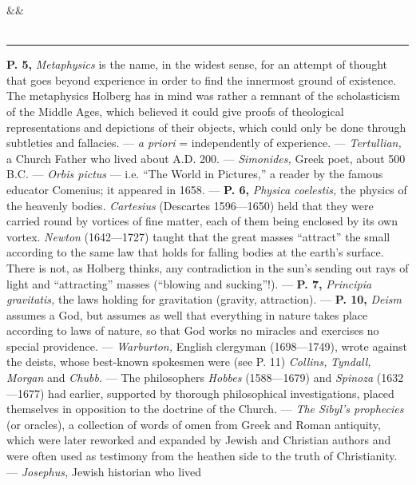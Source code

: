 \documentclass[12pt,a4paper,openany]{book}
\newcommand{\opage}[1]{\marginnote{\footnotesize\textit{[#1]}}}
\newcommand{\anthsection}[2]{\clearpage\begin{center}\ifx&#1&\else{\large #1}\\[0.6em]\fi{\Large #2}\\[0.5em]\rule{3em}{0.4pt}\end{center}\medskip}
\begin{document}
\setcounter{footnote}{0}%
\anthsection{} {NOTES}\opage{301}

\textbf{P. 5,} \textit{Metaphysics} is the name, in the widest sense, for an attempt of thought that goes
beyond experience in order to find the innermost ground of existence. The metaphysics
Holberg has in mind was rather a remnant of the scholasticism of the Middle Ages,
which believed it could give proofs of theological representations and
depictions of their objects, which could only be done through subtleties
and fallacies. --- \textit{a priori} = independently of experience. ---
\textit{Tertullian,} a Church Father who lived about A.D. 200. --- \textit{Simonides,}
Greek poet, about 500 B.C. --- \textit{Orbis pictus} --- i.e. ``The World in
Pictures,'' a reader by the famous educator Comenius; it appeared
in 1658. --- \textbf{P. 6,} \textit{Physica coelestis,} the physics of the heavenly bodies. \textit{Cartesius}
(Descartes 1596---1650) held that they were carried round by vortices of fine
matter, each of them being enclosed by its own vortex. \textit{Newton} (1642---1727) %
taught that the great masses ``attract'' the small according to the same law that
holds for falling bodies at the earth's surface. There is not, as Holberg thinks,
any contradiction in the sun's sending out rays of light and ``attracting'' masses
(``blowing and sucking''!). --- \textbf{P. 7,} \textit{Principia gravitatis,} the laws holding for gravitation
(gravity, attraction). --- \textbf{P. 10,} \textit{Deism} assumes a God,
but assumes as well that everything in nature takes place according to laws of nature, so that God
works no miracles and exercises no special providence. --- \textit{Warburton,} English
clergyman (1698---1749), wrote against the deists, whose best-known spokesmen
were (see P. 11) \textit{Collins,} \textit{Tyndall,} \textit{Morgan} and \textit{Chubb.} --- The philosophers \textit{Hobbes} %
(1588—1679) and \textit{Spinoza} (1632—1677) had earlier, supported by thorough
philosophical investigations, placed themselves in opposition to the doctrine of the Church. --- \textit{The Sibyl's
prophecies} (or oracles), a collection of words of omen from Greek and
Roman antiquity, which were later reworked and expanded by Jewish and
Christian authors and were often used as testimony from the heathen side to %
the truth of Christianity. --- \textit{Josephus,} Jewish historian who lived
\end{document}
